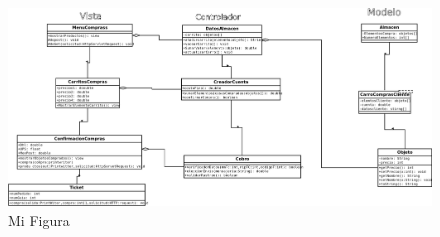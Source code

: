 \documentclass[10pt,a4paper]{article}
\begin{document}
\newpage

\begin{landscape}

\begin{figure}
  \centering
    \includegraphics[width=2\textwidth]{Tarea1}
  \caption{Mi Figura}
  \label{fig:ejemplo}
\end{figure}
\end{landscape} 
\end{document}
